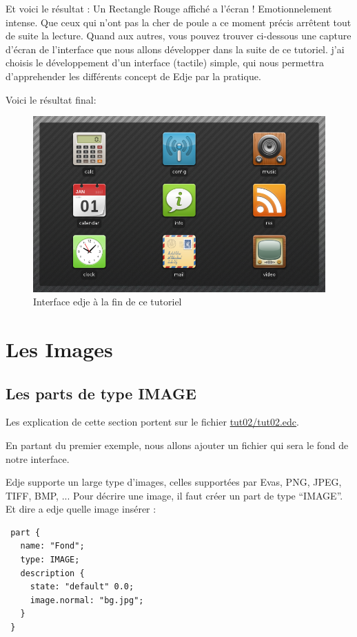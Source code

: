 \documentclass[a4paper]{efr}
\begin{document}
Et voici le résultat : Un Rectangle Rouge affiché a l'écran ! Emotionnelement
intense.
Que ceux qui n'ont pas la cher de poule a ce moment précis arrêtent tout de
suite la lecture. Quand aux autres, vous pouvez trouver ci-dessous une capture
d'écran de l'interface que nous allons développer dans la suite de ce tutoriel.
j'ai choisis le développement d'un interface (tactile) simple, qui nous
permettra d'apprehender les différents concept de Edje par la pratique.

Voici le résultat final:
\begin{figure}
  \begin{center}
    \includegraphics[scale=0.5]{images/screenshot1.png}
  \end{center}
  \caption{Interface edje à la fin de ce tutoriel}
\end{figure}

\section{Les Images}
\subsection{Les parts de type IMAGE}
Les explication de cette section portent sur le fichier
\href{file://tut02/tut02.edc}{tut02/tut02.edc}.

En partant du premier exemple, nous allons ajouter un fichier qui sera le fond
de notre interface.

Edje supporte un large type d'images, celles supportées par Evas,
PNG, JPEG, TIFF, BMP, ...
Pour décrire une image, il faut créer un part de type ``IMAGE''.
Et dire a edje quelle image insérer :

\begin{lstlisting}
 part {
   name: "Fond";
   type: IMAGE;
   description {
     state: "default" 0.0;
     image.normal: "bg.jpg";
   }
 }
\end{lstlisting}
\end{document}
